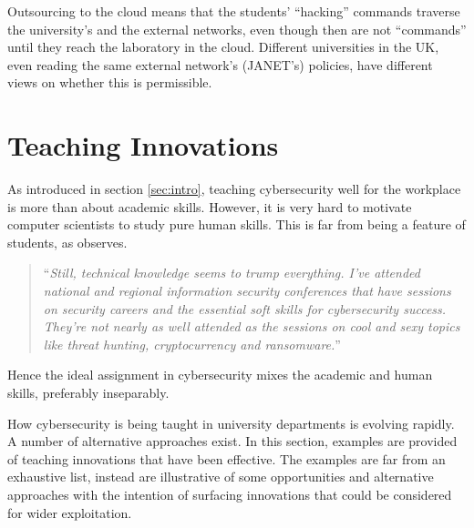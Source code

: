 \documentclass[conference]{IEEEtran}
\begin{document}
Outsourcing to the cloud means that the students' ``hacking'' commands traverse the university's and the external networks, even though then are not ``commands'' until they reach the laboratory in the cloud. Different universities in the UK, even reading the same external network's (JANET's) policies, have different views on whether this is permissible.






\section{Teaching Innovations}\label{sec:authors}
As introduced in section \ref{sec:intro}, teaching cybersecurity well for the workplace is more than about academic skills. However, it is very hard to motivate computer scientists to study pure human skills. This is far from being a feature of students, as \cite{Beaver2019c} observes.
\begin{quote}
``{\emph{Still, technical knowledge seems to trump everything. I've attended national and regional information security conferences that have sessions on security careers and the essential soft skills for cybersecurity success. They're not nearly as well attended as the sessions on cool and sexy topics like threat hunting, cryptocurrency and ransomware.}}''
\end{quote}
Hence the ideal assignment in cybersecurity mixes the academic and human skills, preferably inseparably.

How cybersecurity is being taught in university departments is evolving rapidly. A number of alternative approaches exist. In this section, examples are provided of teaching innovations that have been effective. The examples are far from an exhaustive list, instead are illustrative of some opportunities and alternative approaches with the intention of surfacing innovations that could be considered for wider exploitation.
\end{document}
